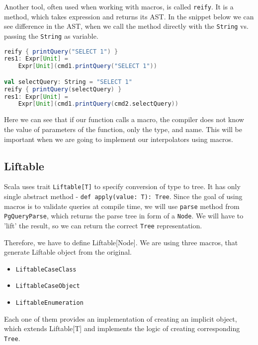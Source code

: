 Another tool, often used when working with macros, is called \texttt{reify}. It is a method, which takes expression and returns its AST. In the snippet below we can see difference in the AST, when we call the method directly with the \texttt{String} vs. passing the \texttt{String} as variable.
\begin{lstlisting}[language=scala, basicstyle=\ttfamily, showstringspaces=false, caption={Comparison of ASTs of function calls with \texttt{String} and with variable}]
reify { printQuery("SELECT 1") }
res1: Expr[Unit] = 
    Expr[Unit](cmd1.printQuery("SELECT 1"))

val selectQuery: String = "SELECT 1"
reify { printQuery(selectQuery) }
res1: Expr[Unit] = 
    Expr[Unit](cmd1.printQuery(cmd2.selectQuery))
\end{lstlisting}
Here we can see that if our function calls a macro, the compiler does not know the value of parameters of the function, only the type, and name. This will be important when we are going to implement our interpolators using macros.

\subsection{Liftable}
Scala uses trait \texttt{Liftable[T]} to specify conversion of type to tree. It has only single abstract method - \texttt{def apply(value: T): Tree}. Since the goal of using macros is to validate queries at compile time, we will use \texttt{parse} method from \texttt{PgQueryParse}, which returns the parse tree in form of a \texttt{Node}. We will have to 'lift' the result, so we can return the correct \texttt{Tree} representation. \cite{Liftable}

Therefore, we have to define Liftable[Node]. We are using three macros, that generate Liftable object from the original. 
\begin{itemize}
    \item \texttt{LiftableCaseClass}
    \item \texttt{LiftableCaseObject}
    \item \texttt{LiftableEnumeration}
\end{itemize}
Each one of them provides an implementation of creating an implicit object, which extends Liftable[T] and implements the logic of creating corresponding \texttt{Tree}.
